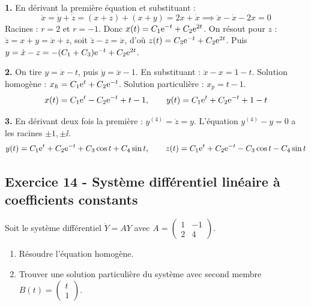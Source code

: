 \documentclass[12pt,a4paper]{article}
\begin{document}
\begin{boitecorrige}
\textbf{1.} En dérivant la première équation et substituant :
\[
\ddot x = \dot y+\dot z = (x+z)+(x+y) = 2x+\dot x \implies \ddot x - \dot x - 2x = 0
\]
Racines : $r=2$ et $r=-1$. Donc $x(t)=C_1\mathrm{e}^{-t}+C_2\mathrm{e}^{2t}$.
On résout pour $z$ : $\dot z = x+y = \dot x+z$, soit $\dot z - z = \dot x$, d'où $z(t)=C_3\mathrm{e}^{-t}+C_2\mathrm{e}^{2t}$.
Puis $y = \dot x - z = -(C_1+C_3)\mathrm{e}^{-t}+C_2\mathrm{e}^{2t}$.

\textbf{2.} On tire $y = \dot x - t$, puis $\dot y = \ddot x - 1$. En substituant : $\ddot x - x = 1-t$.
Solution homogène : $x_h = C_1\mathrm{e}^t + C_2\mathrm{e}^{-t}$. Solution particulière : $x_p = t-1$.
\[
x(t) = C_1\mathrm{e}^t - C_2\mathrm{e}^{-t} + t-1, \qquad y(t) = C_1\mathrm{e}^t + C_2\mathrm{e}^{-t} + 1-t
\]

\textbf{3.} En dérivant deux fois la première : $y^{(4)} = \ddot z = y$. L'équation $y^{(4)}-y=0$ a les racines $\pm1,\pm\ii$.
\[
y(t) = C_1\mathrm{e}^t+C_2\mathrm{e}^{-t}+C_3\cos t+C_4\sin t, \qquad z(t) = C_1\mathrm{e}^t+C_2\mathrm{e}^{-t}-C_3\cos t-C_4\sin t
\]
\end{boitecorrige}

\subsection*{Exercice 14 - Système différentiel linéaire à coefficients constants \niveau{\difficile}}

\begin{boiteexercice}
Soit le système différentiel $\dot Y = AY$ avec $A = \begin{pmatrix}1 & -1\\ 2 & 4\end{pmatrix}$.
\begin{enumerate}
  \item Résoudre l'équation homogène.
  \item Trouver une solution particulière du système avec second membre $B(t) = \begin{pmatrix}t\\1\end{pmatrix}$.
\end{enumerate}
\end{boiteexercice}
\end{document}
